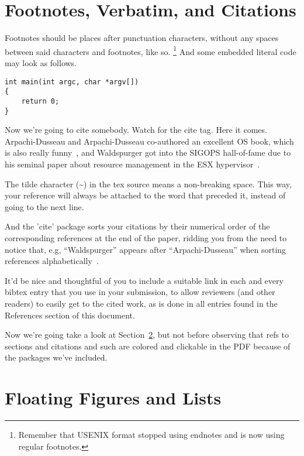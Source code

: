 \section{Footnotes, Verbatim, and Citations}

Footnotes should be places after punctuation characters, without any
spaces between said characters and footnotes, like so.%
\footnote{Remember that USENIX format stopped using endnotes and is
  now using regular footnotes.} And some embedded literal code may
look as follows.

\begin{verbatim}
int main(int argc, char *argv[]) 
{
    return 0;
}
\end{verbatim}

Now we're going to cite somebody. Watch for the cite tag. Here it
comes. Arpachi-Dusseau and Arpachi-Dusseau co-authored an excellent OS
book, which is also really funny~\cite{arpachiDusseau18:osbook}, and
Waldspurger got into the SIGOPS hall-of-fame due to his seminal paper
about resource management in the ESX hypervisor~\cite{waldspurger02}.

The tilde character (\~{}) in the tex source means a non-breaking
space. This way, your reference will always be attached to the word
that preceded it, instead of going to the next line.

And the 'cite' package sorts your citations by their numerical order
of the corresponding references at the end of the paper, ridding you
from the need to notice that, e.g, ``Waldspurger'' appears after
``Arpachi-Dusseau'' when sorting references
alphabetically~\cite{waldspurger02,arpachiDusseau18:osbook}.

It'd be nice and thoughtful of you to include a suitable link in each
and every bibtex entry that you use in your submission, to allow
reviewers (and other readers) to easily get to the cited work, as is
done in all entries found in the References section of this document.

Now we're going take a look at Section~\ref{sec:figs}, but not before
observing that refs to sections and citations and such are colored and
clickable in the PDF because of the packages we've included.

\section{Floating Figures and Lists}
\label{sec:figs}


